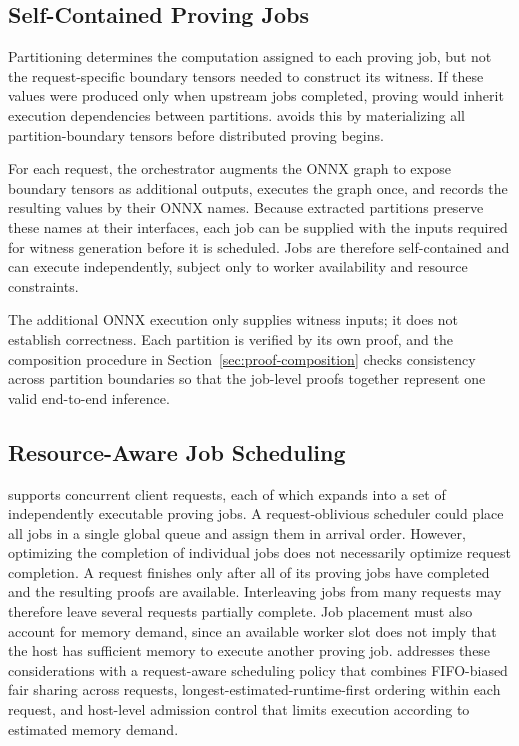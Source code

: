 \subsection{Self-Contained Proving Jobs}
\label{sec:self-contained-proving-jobs}

Partitioning determines the computation assigned to each proving job, but not the request-specific boundary tensors needed to construct its witness. If these values were produced only when upstream jobs completed, proving would inherit execution dependencies between partitions. \TITLE{} avoids this by materializing all partition-boundary tensors before distributed proving begins.

For each request, the orchestrator augments the ONNX graph to expose boundary tensors as additional outputs, executes the graph once, and records the resulting values by their ONNX names. Because extracted partitions preserve these names at their interfaces, each job can be supplied with the inputs required for witness generation before it is scheduled. Jobs are therefore self-contained and can execute independently, subject only to worker availability and resource constraints.

The additional ONNX execution only supplies witness inputs; it does not establish correctness. Each partition is verified by its own proof, and the composition procedure in Section~\ref{sec:proof-composition} checks consistency across partition boundaries so that the job-level proofs together represent one valid end-to-end inference.

\subsection{Resource-Aware Job Scheduling}
\label{sec:resource-aware-scheduling}

\TITLE{} supports concurrent client requests, each of which expands into a set of independently executable proving jobs. A request-oblivious scheduler could place all jobs in a single global queue and assign them in arrival order. However, optimizing the completion of individual jobs does not necessarily optimize request completion. A request finishes only after all of its proving jobs have completed and the resulting proofs are available. Interleaving jobs from many requests may therefore leave several requests partially complete. Job placement must also account for memory demand, since an available worker slot does not imply that the host has sufficient memory to execute another proving job. \TITLE{} addresses these considerations with a request-aware scheduling policy that combines FIFO-biased fair sharing across requests, longest-estimated-runtime-first ordering within each request, and host-level admission control that limits execution according to estimated memory demand.

